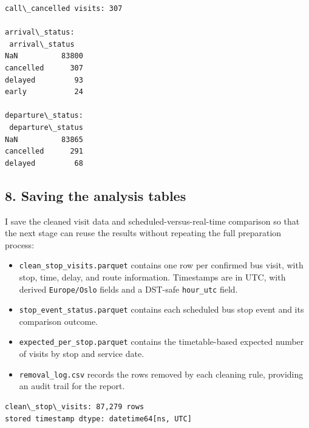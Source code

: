 \documentclass[11pt]{article}
\providecommand{\tightlist}{%
      \setlength{\itemsep}{0pt}\setlength{\parskip}{0pt}}
\begin{document}
    
    \begin{Verbatim}[commandchars=\\\{\}]
call\_cancelled visits: 307

arrival\_status:
 arrival\_status
NaN          83800
cancelled      307
delayed         93
early           24

departure\_status:
 departure\_status
NaN          83865
cancelled      291
delayed         68
    \end{Verbatim}

    \subsection{8. Saving the analysis
tables}\label{saving-the-analysis-tables}

I save the cleaned visit data and scheduled-versus-real-time comparison
so that the next stage can reuse the results without repeating the full
preparation process:

\begin{itemize}
\tightlist
\item
  \texttt{clean\_stop\_visits.parquet} contains one row per confirmed
  bus visit, with stop, time, delay, and route information. Timestamps
  are in UTC, with derived \texttt{Europe/Oslo} fields and a DST-safe
  \texttt{hour\_utc} field.
\item
  \texttt{stop\_event\_status.parquet} contains each scheduled bus stop
  event and its comparison outcome.
\item
  \texttt{expected\_per\_stop.parquet} contains the timetable-based
  expected number of visits by stop and service date.
\item
  \texttt{removal\_log.csv} records the rows removed by each cleaning
  rule, providing an audit trail for the report.
\end{itemize}

    \begin{Verbatim}[commandchars=\\\{\}]
clean\_stop\_visits: 87,279 rows
stored timestamp dtype: datetime64[ns, UTC]
    \end{Verbatim}
\end{document}
